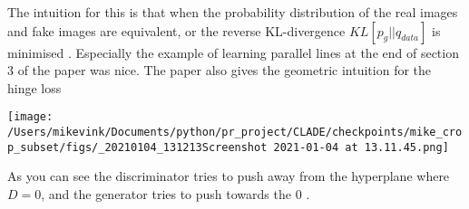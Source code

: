 \documentclass{memoir}
\begin{document}
The intuition for this is that when the probability distribution of the real
images and fake images are equivalent, or the reverse KL-divergence \(KL \left[ p_{g} || q_{data}\right]\)
is minimised \cite{miyatoSpectralNormalizationGenerative2018}. Especially the
example of learning parallel lines at the end of section 3 of the paper was
nice. The paper also gives the geometric intuition for the hinge loss



\begin{center}
\texttt{[image: /Users/mikevink/Documents/python/pr\_project/CLADE/checkpoints/mike\_crop\_subset/figs/\_20210104\_131213Screenshot 2021-01-04 at 13.11.45.png]}
\end{center}

As you can see the discriminator tries to push away from the hyperplane where \(D = 0\),
and the generator tries to push towards the \(0\) .




\end{document}
